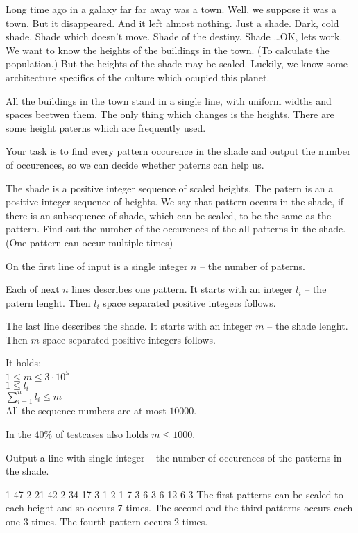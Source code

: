 





Long time ago in a galaxy far far away was a town.
Well, we suppose it was a town.
But it disappeared. And it left almost nothing.
Just a shade. Dark, cold shade.
Shade which doesn't move.
Shade of the destiny.
Shade \dots  OK, lets work.
We want to know the heights of the buildings in the town.
(To calculate the population.)
But the heights of the shade may be scaled.
Luckily, we know some architecture specifics of the culture
which ocupied this planet.

All the buildings in the town stand in a single line,
with uniform widths and spaces beetwen them.
The only thing which changes is the heights.
There are some height paterns which are frequently used.

Your task is to find every pattern occurence in the shade
and output the number of occurences,
so we can decide whether paterns can help us.



The shade is a positive integer sequence of scaled heights.
The patern is an a positive integer sequence of heights.
We say that pattern occurs in the shade,
if there is an subsequence of shade, which can be scaled,
to be the same as the pattern.
Find out the number of the occurences
of the all patterns in the shade.
(One pattern can occur multiple times)



On the first line of input is a single integer $n$
-- the number of paterns.

Each of next $n$ lines describes one pattern.
It starts with an integer $l_i$ -- the patern lenght.
Then $l_i$ space separated positive integers follows.

The last line describes the shade.
It starts with an integer $m$ -- the shade lenght.
Then $m$ space separated positive integers follows.

\bigskip

It holds:\\
$1 \leq m \leq 3\cdot10^5$\\
$1 \leq l_i$\\
$\sum^{n}_{i=1} l_i \leq m$\\
All the sequence numbers are at most $10000$.

\smallskip

In the $40\%$ of testcases also holds $m \leq 1000$.


Output a line with single integer
-- the number of occurences of the patterns in the shade.



1 47
2 21 42
2 34 17
3 1 2 1
7 3 6 3 6 12 6 3
\sampleCOMMENT
The first patterns can be scaled to
each height and so occurs 7 times.
The second and the third patterns occurs each one 3 times.
The fourth pattern occurs 2 times.
\sampleEND



